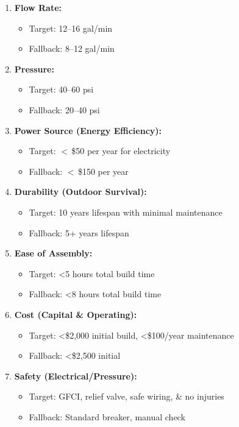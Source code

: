 \documentclass[12pt]{article}
\begin{document}
\begin{enumerate}
    \item \textbf{Flow Rate:} 
    \begin{itemize}
        \item Target: 12--16 gal/min
        \item Fallback: 8--12 gal/min
    \end{itemize}

    \item \textbf{Pressure:}
    \begin{itemize}
        \item Target: 40--60 psi
        \item Fallback: 20--40 psi
    \end{itemize}

    \item \textbf{Power Source (Energy Efficiency):}
    \begin{itemize}
        \item Target: $<$\,\$50 per year for electricity
        \item Fallback: $<$\,\$150 per year
    \end{itemize}

    \item \textbf{Durability (Outdoor Survival):}
    \begin{itemize}
        \item Target: 10 years lifespan with minimal maintenance
        \item Fallback: 5+ years lifespan
    \end{itemize}

    \item \textbf{Ease of Assembly:}
    \begin{itemize}
        \item Target: \textless{}5 hours total build time
        \item Fallback: \textless{}8 hours total build time
    \end{itemize}

    \item \textbf{Cost (Capital \& Operating):}
    \begin{itemize}
        \item Target: \textless{}\$2,000 initial build, \textless{}\$100/year maintenance
        \item Fallback: \textless{}\$2,500 initial
    \end{itemize}

    \item \textbf{Safety (Electrical/Pressure):}
    \begin{itemize}
        \item Target: GFCI, relief valve, safe wiring, & no injuries
        \item Fallback: Standard breaker, manual check
    \end{itemize}
\end{enumerate}
\end{document}

